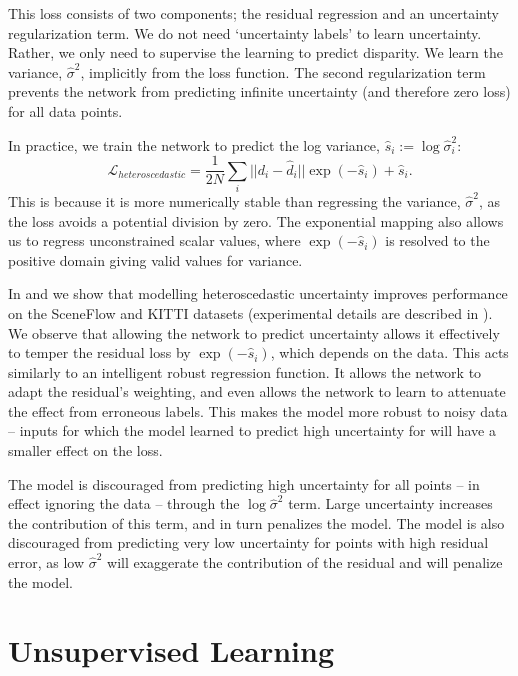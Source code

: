 This loss consists of two components; the residual regression and an uncertainty regularization term. We do not need `uncertainty labels' to learn uncertainty. Rather, we only need to supervise the learning to predict disparity. We learn the variance, $\hat{\sigma}^2$, implicitly from the loss function. The second regularization term prevents the network from predicting infinite uncertainty (and therefore zero loss) for all data points.

In practice, we train the network to predict the log variance, $\hat{s}_i := \log \hat{\sigma}_i^2$: 
\begin{equation}
\mathcal{L}_{heteroscedastic} = \frac{1}{2N} \sum_i ||d_i-\hat{d}_i|| \exp (-\hat{s}_i) + \hat{s}_i.
\label{eqn:aleatoric_regression_loss2}
\end{equation}
This is because it is more numerically stable than regressing the variance, $\hat{\sigma}^2$, as the loss avoids a potential division by zero. The exponential mapping also allows us to regress unconstrained scalar values, where $\exp(-\hat{s}_i)$ is resolved to the positive domain giving valid values for variance.

In  and  we show that modelling heteroscedastic uncertainty improves performance on the SceneFlow and KITTI datasets (experimental details are described in ). We observe that allowing the network to predict uncertainty allows it effectively to temper the residual loss by $\exp(-\hat{s}_i)$, which depends on the data. This acts similarly to an intelligent robust regression function. It allows the network to adapt the residual's weighting, and even allows the network to learn to attenuate the effect from erroneous labels. This makes the model more robust to noisy data -- inputs for which the model learned to predict high uncertainty for will have a smaller effect on the loss.

The model is discouraged from predicting high uncertainty for all points -- in effect ignoring the data -- through the $\log \hat{\sigma}^2$ term. Large uncertainty increases the contribution of this term, and in turn penalizes the model. The model is also discouraged from predicting very low uncertainty for points with high residual error, as low $\hat{\sigma}^2$ will exaggerate the contribution of the residual and will penalize the model.

\section{Unsupervised Learning}
\label{sec:unsupervised}

